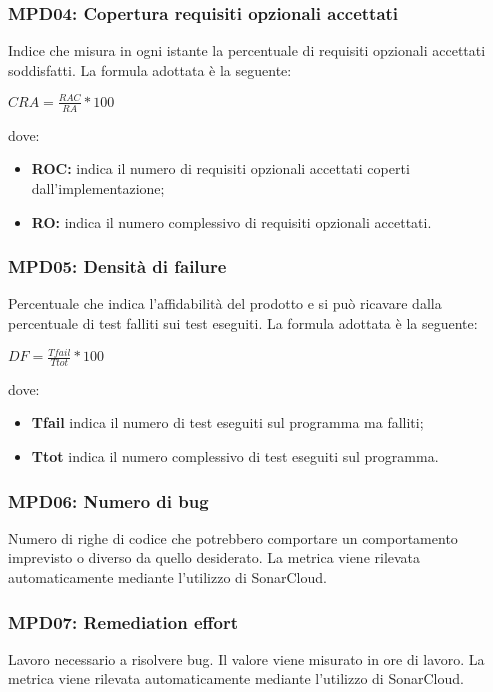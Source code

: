 \subsubsection{MPD04: Copertura requisiti opzionali accettati}
Indice che misura in ogni istante la percentuale di requisiti opzionali accettati soddisfatti.
La formula adottata è la seguente:
\begin{center}
    $CRA = \displaystyle \frac{RAC}{RA}*100$
\end{center}
dove:
\begin{itemize}
    \item \textbf{ROC:} indica il numero di requisiti opzionali accettati coperti dall'implementazione;
    \item \textbf{RO:} indica il numero complessivo di requisiti opzionali accettati.
\end{itemize}

\subsubsection{MPD05: Densità di failure}
Percentuale che indica l'affidabilità del prodotto e si può ricavare dalla percentuale di test falliti sui test eseguiti.
La formula adottata è la seguente:
\begin{center}
    $DF = \displaystyle \frac{Tfail}{Ttot}*100$
\end{center}
dove:
\begin{itemize}
    \item \textbf{Tfail} indica il numero di test eseguiti sul programma ma falliti;
    \item \textbf{Ttot} indica il numero complessivo di test eseguiti sul programma.
\end{itemize}

\subsubsection{MPD06: Numero di bug}
Numero di righe di codice che potrebbero comportare un comportamento imprevisto o diverso da quello desiderato.
La metrica viene rilevata automaticamente mediante l’utilizzo di {SonarCloud}\glo.

\subsubsection{MPD07: Remediation effort}
Lavoro necessario a risolvere bug. Il valore viene misurato in ore di lavoro.
La metrica viene rilevata automaticamente mediante l’utilizzo di {SonarCloud}\glo.

